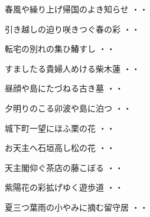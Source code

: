 \vspace{0.6cm}
\begin{shiika}春風や繰り上げ帰国のよき知らせ
\hfill{・・}\end{shiika}
\vspace{0.6cm}
\begin{shiika}引き越しの迫り咲きつぐ春の彩
\hfill{・・}\end{shiika}
\vspace{0.6cm}
\begin{shiika}転宅の別れの集ひ鰆すし
\hfill{・・}\end{shiika}
\vspace{0.6cm}
\begin{shiika}すましたる貴婦人めける柴木蓮
\hfill{・・}\end{shiika}
\vspace{0.6cm}
\begin{shiika}昼顔や島にたづねる古き墓
\hfill{・・}\end{shiika}
\vspace{0.6cm}
\begin{shiika}夕明りのこる卯波や島に泊つ
\hfill{・・}\end{shiika}
\vspace{0.6cm}
\begin{shiika}城下町一望にほふ栗の花
\hfill{・・}\end{shiika}
\vspace{0.6cm}
\begin{shiika}お天主へ石垣高し松の花
\hfill{・・}\end{shiika}
\vspace{0.6cm}
\begin{shiika}天主閣仰ぐ茶店の藤こぼる
\hfill{・・}\end{shiika}
\vspace{0.6cm}
\begin{shiika}紫陽花の彩拡げゆく遊歩道
\hfill{・・}\end{shiika}
\vspace{0.6cm}
\begin{shiika}夏三つ葉雨の小やみに摘む留守居
\hfill{・・}\end{shiika}
